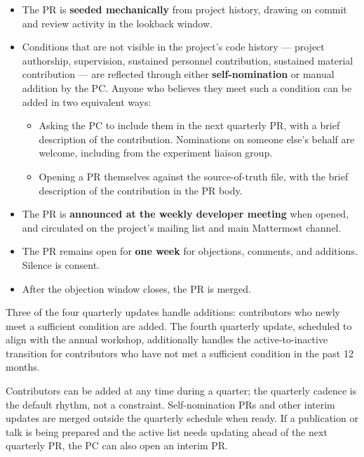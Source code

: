 \documentclass[11pt,a4paper]{article}
\begin{document}
\begin{itemize}
    \item The PR is \textbf{seeded mechanically} from project history, drawing on
          commit and review activity in the lookback window.
    \item Conditions that are not visible in the project's code history --- project
          authorship, supervision, sustained personnel contribution, sustained
          material contribution --- are reflected through either
          \textbf{self-nomination} or manual addition by the PC. Anyone who
          believes they meet such a condition can be added in two equivalent
          ways:
          \begin{itemize}
              \item Asking the PC to include them in the next quarterly PR, with a
                    brief description of the contribution. Nominations on someone
                    else's behalf are welcome, including from the experiment liaison
                    group.
              \item Opening a PR themselves against the source-of-truth file, with
                    the brief description of the contribution in the PR body.
          \end{itemize}
    \item The PR is \textbf{announced at the weekly developer meeting} when
          opened, and circulated on the project's mailing list and main Mattermost
          channel.
    \item The PR remains open for \textbf{one week} for objections, comments, and
          additions. Silence is consent.
    \item After the objection window closes, the PR is merged.
\end{itemize}

Three of the four quarterly updates handle additions: contributors who newly meet
a sufficient condition are added. The fourth quarterly update, scheduled to align
with the annual workshop, additionally handles the active-to-inactive transition
for contributors who have not met a sufficient condition in the past 12 months.

Contributors can be added at any time during a quarter; the quarterly cadence is
the default rhythm, not a constraint. Self-nomination PRs and other interim updates
are merged outside the quarterly schedule when ready. If a publication or talk is
being prepared and the active list needs updating ahead of the next quarterly PR,
the PC can also open an interim PR.
\end{document}
